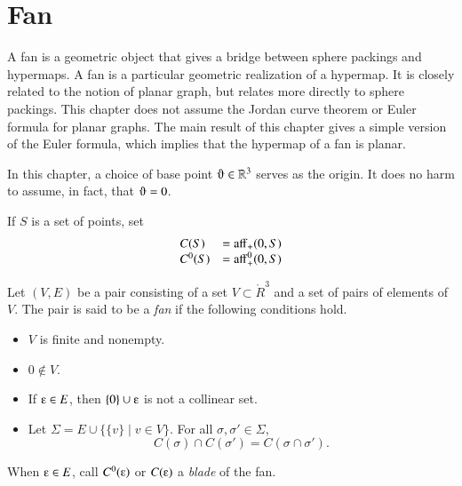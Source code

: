 
\chapter{Fan}\label{sec:fan}

A fan is a geometric object that gives a bridge between sphere packings and hypermaps.  A fan is a particular geometric realization of a hypermap.  It is closely related to the notion of planar graph, but relates more directly to sphere packings.  This chapter does not  assume the Jordan curve theorem or Euler formula for planar graphs.  The main result of this chapter gives a simple version of the Euler formula, 
which implies that the hypermap of a fan is planar.

In this chapter,  a choice of base point $\orgn\in\ring{R}^3$ serves as the origin.  It does no harm to assume, in fact, that $\orgn =0$.

If $S$ is a set of points,
set
  $$
  \begin{array}{lll}
  C(S) &= {\operatorname{aff}}_+(0,S)\\
  C^0(S) &= {\operatorname{aff}}^0_+(0,S)\\
  \end{array}
  $$

\begin{definition}[fan]  
Let $(V,E)$ be a pair consisting of a set $V\subset \ring{R}^3$ and a set of pairs of elements of $V$.  The pair is said to be
a {\it fan\/} if the following conditions hold.
    \begin{itemize}
    \item $V$ is finite and nonempty.
    \item $0\not\in V$.
    \item If $\e \in E$, then $\{0\}\cup \e$ is not a collinear set.
    \item Let $\Sigma = E \cup \{\{v\}\mid v\in V\}$.
    For all $\sigma,\sigma'\in \Sigma$, 
 $$C(\sigma)\cap C(\sigma') = C(\sigma\cap \sigma').$$
    \end{itemize}
When $\e\in E$, call $C^0(\e)$ or $C(\e)$ a {\it blade\/} of the fan.
\end{definition}

\bigskip\hbox{~}\bigskip


